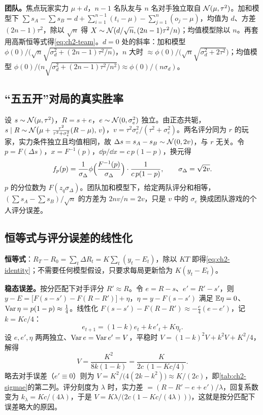 \textbf{团队。}焦点玩家实力 $\mu+d$，$n-1$ 名队友与 $n$ 名对手独立取自 $\mathcal{N}(\mu,\tau^2)$。加和模型下 $\sum s_A-\sum s_B=d+\sum_{i=1}^{n-1}(t_i-\mu)-\sum_{j=1}^{n}(o_j-\mu)$，均值为 $d$、方差 $(2n-1)\tau^2$，除以 $\sqrt n$ 得 $X\sim\mathcal{N}(d/\sqrt n,(2n-1)\tau^2/n)$；均值模型除以 $n$。再套用高斯恒等式得\cref{eq:ch2-team}。$d=0$ 处的斜率：加和模型 $\phi(0)\big/\bigl(\sqrt n\sqrt{\sigma_d^2+(2n-1)\tau^2/n}\bigr)$，$n$ 大时 $\approx\phi(0)/\bigl(\sqrt n\sqrt{\sigma_d^2+2\tau^2}\bigr)$；均值模型 $\phi(0)\big/\bigl(n\sqrt{\sigma_d^2+(2n-1)\tau^2/n^2}\bigr)\approx\phi(0)/(n\sigma_d)$。

\subsection{“五五开”对局的真实胜率}
\label{app:ch2-fair}

设 $s\sim\mathcal{N}(\mu,\tau^2)$，$R=s+e$，$e\sim\mathcal{N}(0,\sigma_e^2)$ 独立。由正态共轭，$s\mid R\sim\mathcal{N}\bigl(\mu+\tfrac{\tau^2}{\tau^2+\sigma_e^2}(R-\mu),\,v\bigr)$，$v=\tau^2\sigma_e^2/(\tau^2+\sigma_e^2)$。两名评分同为 $r$ 的玩家，实力条件独立且均值相同，故 $\Delta s=s_A-s_B\sim\mathcal{N}(0,2v)$，与 $r$ 无关。令 $p=F(\Delta s)$，$x=F^{-1}(p)$，$\dd p/\dd x=c\,p(1-p)$，换元得
\[
  f_p(p)=\frac{1}{\sigma_\Delta}\phi\Bigl(\frac{F^{-1}(p)}{\sigma_\Delta}\Bigr)\cdot\frac{1}{c\,p(1-p)},\qquad \sigma_\Delta=\sqrt{2v}.
\]
$p$ 的分位数为 $F(z_q\sigma_\Delta)$。团队加和模型下，给定两队评分和相等，$(\sum s_A-\sum s_B)/\sqrt n$ 的方差为 $2nv/n=2v$，只是 $v$ 中的 $\sigma_e$ 换成团队游戏的个人评分误差。

\subsection{恒等式与评分误差的线性化}
\label{app:ch2-linear}

\textbf{恒等式}：$R_T-R_0=\sum_t\Delta R_t=K\sum_t(y_t-E_t)$，除以 $KT$ 即得\cref{eq:ch2-identity}；不需要任何模型假设，只要求每局更新恰为 $K(y_t-E_t)$。

\textbf{稳态误差。}按分匹配下对手评分 $R'\approx R$。令 $e=R-s$、$e'=R'-s'$，则 $y-E=\bigl[F(s-s')-F(R-R')\bigr]+\eta$，$\eta=y-F(s-s')$ 满足 $\mathbb{E}\eta=0$、$\operatorname{Var}\eta=p(1-p)\approx\tfrac14$。线性化 $F(s-s')-F(R-R')\approx-\tfrac c4(e-e')$，记 $k=Kc/4$：
\[
  e_{t+1}=(1-k)e_t+k\,e'_t+K\eta_t .
\]
设 $e,e',\eta$ 两两独立、$\operatorname{Var} e=\operatorname{Var} e'=V$，平稳时 $V=(1-k)^2V+k^2V+K^2/4$，解得
\[
  V=\frac{K^2}{8k(1-k)}=\frac{K}{2c\,(1-Kc/4)} .
\]
略去对手误差（$e'\equiv0$）则为 $V=K^2/\bigl(4(2k-k^2)\bigr)\approx K/(2c)$，即\cref{tab:ch2-sigmae}的第二列。评分刻度为 $\lambda$ 时，实力差 $=(R-R'-e+e')/\lambda$，回复系数变为 $k_\lambda=Kc/(4\lambda)$，于是 $V=K\lambda/\bigl(2c(1-Kc/(4\lambda))\bigr)$，这就是按分匹配下误差略大的原因。

